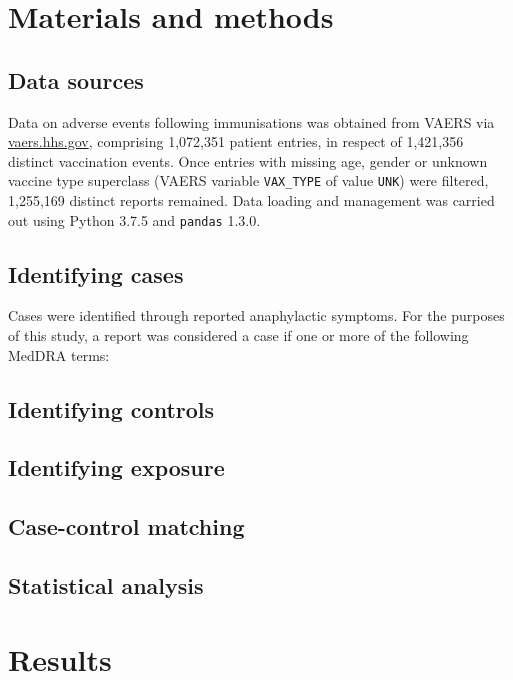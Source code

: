 \documentclass{article}
\begin{document}
\section{Materials and methods}

\subsection{Data sources}

Data on adverse events following immunisations was obtained from VAERS via \url{vaers.hhs.gov}, comprising 1,072,351 patient entries, in respect of 1,421,356 distinct vaccination events.
Once entries with missing age, gender or unknown vaccine type superclass (VAERS variable \texttt{VAX\_TYPE} of value \texttt{UNK}) were filtered, 1,255,169 distinct reports remained.
Data loading and management was carried out using Python 3.7.5 and \texttt{pandas} 1.3.0.\cite{mckinney2011pandas}

\subsection{Identifying cases}\label{subsec:identifying-cases}

Cases were identified through reported anaphylactic symptoms.
For the purposes of this study, a report was considered a case if one or more of the following MedDRA terms:


\subsection{Identifying controls}


\subsection{Identifying exposure}


\subsection{Case-control matching}


\subsection{Statistical analysis}

\section{Results}
\end{document}

